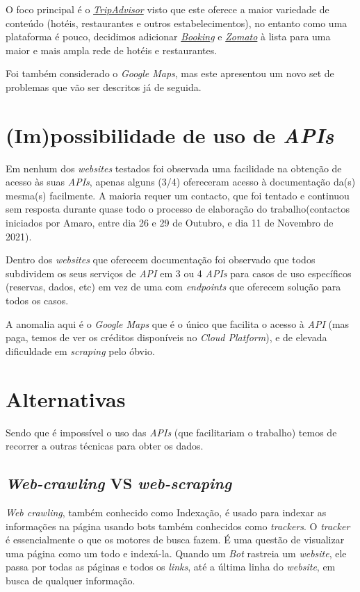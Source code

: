 O foco principal é o \textit{\href{https://www.tripadvisor.com/}{TripAdvisor}} visto que este oferece a maior variedade de conteúdo (hotéis, restaurantes e outros estabelecimentos), no entanto como uma plataforma é pouco, decidimos adicionar \textit{\href{https://www.booking.com/}{Booking}} e \textit{\href{https://www.zomato.com/}{Zomato}} à lista para uma maior e mais ampla rede de hotéis e restaurantes.

Foi também considerado o \textit{Google Maps}, mas este apresentou um novo set de problemas que vão ser descritos já de seguida.

\section{(Im)possibilidade de uso de \textit{APIs}}

Em nenhum dos \textit{websites} testados foi observada uma facilidade na obtenção de acesso às suas \textit{APIs}, apenas alguns (3/4) ofereceram acesso à documentação da(s) mesma(s) facilmente. A maioria requer um contacto, que foi tentado e continuou sem resposta durante quase todo o processo de elaboração do trabalho(contactos iniciados por Amaro, entre dia 26 e 29 de Outubro, e dia 11 de Novembro de 2021).

Dentro dos \textit{websites} que oferecem documentação foi observado que todos subdividem os seus serviços de \textit{API} em 3 ou 4 \textit{APIs} para casos de uso específicos (reservas, dados, etc) em vez de uma com \textit{endpoints} que oferecem solução para todos os casos.

A anomalia aqui é o \textit{Google Maps} que é o único que facilita o acesso à \textit{API} (mas paga, temos de ver os créditos disponíveis no \textit{Cloud Platform}), e de elevada dificuldade em \textit{scraping} pelo óbvio.

\section{Alternativas}

Sendo que é impossível o uso das \textit{APIs} (que facilitariam o trabalho) temos de recorrer a outras técnicas para obter os dados.

\subsection{\textit{Web-crawling} VS \textit{web-scraping}}

\textit{Web crawling}, também conhecido como Indexação, é usado para indexar as informações na página usando bots também conhecidos como \textit{trackers}.
O \textit{tracker} é essencialmente o que os motores de busca fazem.
É uma questão de visualizar uma página como um todo e indexá-la.
Quando um \textit{Bot} rastreia um \textit{website}, ele passa por todas as páginas e todos os \textit{links}, até a última linha do \textit{website}, em busca de qualquer informação.

